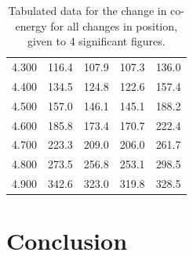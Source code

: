 \documentclass[a4paper]{IEEEtran}
\begin{document}
\begin{table}[ht]
\begin{tabular}{c|cccc}
            4.300 & 116.4 & 107.9 & 107.3 & 136.0 \\
            4.400 & 134.5 & 124.8 & 122.6 & 157.4 \\
            4.500 & 157.0 & 146.1 & 145.1 & 188.2 \\
            4.600 & 185.8 & 173.4 & 170.7 & 222.4 \\
            4.700 & 223.3 & 209.0 & 206.0 & 261.7 \\
            4.800 & 273.5 & 256.8 & 253.1 & 298.5 \\
            4.900 & 342.6 & 323.0 & 319.8 & 328.5
        \end{tabular}
        \caption{Tabulated data for the change in co-energy for all changes in position, given to 4 significant figures.}
        \label{coenergy}
    \end{table}


\section{Conclusion}

\printbibliography

% 

% 
 
% 
\end{document}
